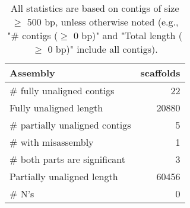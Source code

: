 \documentclass[12pt,a4paper]{article}
\begin{document}
\begin{table}[ht]
\begin{center}
\caption{All statistics are based on contigs of size $\geq$ 500 bp, unless otherwise noted (e.g., "\# contigs ($\geq$ 0 bp)" and "Total length ($\geq$ 0 bp)" include all contigs).}
\begin{tabular}{|l*{1}{|r}|}
\hline
Assembly & scaffolds \\ \hline
\# fully unaligned contigs & 22 \\ \hline
Fully unaligned length & 20880 \\ \hline
\# partially unaligned contigs & 5 \\ \hline
\hspace{5mm}\# with misassembly & 1 \\ \hline
\hspace{5mm}\# both parts are significant & 3 \\ \hline
Partially unaligned length & 60456 \\ \hline
\# N's & 0 \\ \hline
\end{tabular}
\end{center}
\end{table}
\end{document}
